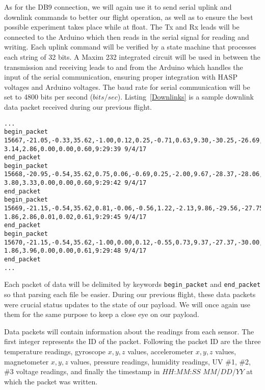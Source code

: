 As for the DB9 connection, we will again use it to send serial uplink and downlink commands to better our flight operation, as well as to ensure the best possible experiment takes place while at float.  The Tx and Rx leads will be connected to the Arduino which then reads in the serial signal for reading and writing.  Each uplink command will be verified by a state machine that processes each string of \num{32} bits.  A Maxim 232 integrated circuit will be used in between the transmission and receiving leads to and from the Arduino which handles the input of the serial communication, ensuring proper integration with HASP voltages and Arduino voltages.  The baud rate for serial communication will be set to 4800 bits per second ($bits/sec$). Listing~\ref{Downlinks} is a sample downlink data packet received during our previous flight.

\lstset{basicstyle=\small, numbers=left, xleftmargin=2em, frame=tb, label = Downlinks, framexleftmargin=1.5em}
\begin{lstlisting}[caption = Sample of downlinked data packets ID: 15667 - 15670 from SORA 2017~\cite{SORA}.]
...
begin_packet
15667,-21.05,-0.33,35.62,-1.00,0.12,0.25,-0.71,0.63,9.30,-30.25,-26.69,-60.88
3.14,2.86,0.00,0.00,0.60,9:29:39 9/4/17
end_packet
begin_packet
15668,-20.95,-0.54,35.62,0.75,0.06,-0.69,0.25,-2.00,9.67,-28.37,-28.06,-60.06
3.80,3.33,0.00,0.00,0.60,9:29:42 9/4/17
end_packet
begin_packet
15669,-21.15,-0.54,35.62,0.81,-0.06,-0.56,1.22,-2.13,9.86,-29.56,-27.75,-57.88
1.86,2.86,0.01,0.02,0.61,9:29:45 9/4/17
end_packet
begin_packet
15670,-21.15,-0.54,35.62,-1.00,0.00,0.12,-0.55,0.73,9.37,-27.37,-30.00,-58.75
1.86,3.96,0.00,0.00,0.61,9:29:48 9/4/17
end_packet
...
\end{lstlisting}
\medskip

Each packet of data will be delimited by keywords \verb|begin_packet| and \verb|end_packet| so that parsing each file be easier.  During our previous flight, these data packets were crucial status updates to the state of our payload.  We will once again use them for the same purpose to keep a close eye on our payload.

Data packets will contain information about the readings from each sensor.  The first integer represents the ID of the packet.  Following the packet ID are the three temperature readings, gyroscope $x, y, z$ values, accelerometer $x, y, z$ values, magnetometer $x, y, z$ values, pressure readings, humidity readings, UV \#1, \#2, \#3 voltage readings, and finally the timestamp in $HH$:$MM$:$SS$ $MM$/$DD$/$YY$ at which the packet was written.  


